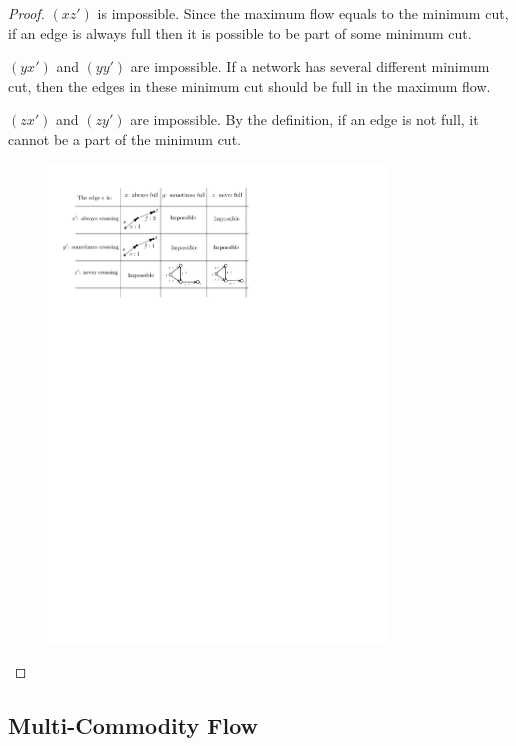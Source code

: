 \documentclass[12pt,a4]{article}
\begin{document}
\begin{proof}

  $(xz')$ is impossible. Since the maximum flow equals to the minimum cut, if an edge is always full then it is possible to be part of some minimum cut.\par
  $(yx')$ and $(yy')$ are impossible. If a network has several different minimum cut, then the edges in these minimum cut should be full in the maximum flow.\par
  $(zx')$ and $(zy')$ are impossible. By the definition, if an edge is not full, it cannot be a part of the minimum cut.\par
  \begin{figure}[htbp]
  \begin{center}
  \includegraphics[width=0.8\textwidth]{figures/always-somtimes-never-table-answer.pdf}

  \end{center}
\end{figure}
\end{proof}

\subsection{Multi-Commodity Flow}
\end{document}
